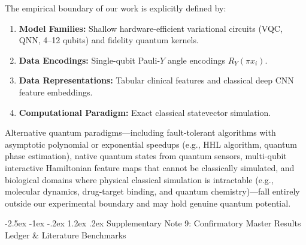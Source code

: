 \documentclass[10pt,a4paper]{article}
\makeatletter
\renewcommand{\section}{\@startsection{section}{1}{\z@}%
  {-2.5ex \@plus -1ex \@minus -.2ex}%
  {1.2ex \@plus.2ex}%
  {\normalfont\Large\sffamily\bfseries\color{naturedark}}}
\makeatother
\begin{document}
The empirical boundary of our work is explicitly defined by:
\begin{enumerate}
  \item \textbf{Model Families:} Shallow hardware-efficient variational circuits (VQC, QNN, 4--12 qubits) and fidelity quantum kernels.
  \item \textbf{Data Encodings:} Single-qubit Pauli-$Y$ angle encodings $R_Y(\pi x_i)$.
  \item \textbf{Data Representations:} Tabular clinical features and classical deep CNN feature embeddings.
  \item \textbf{Computational Paradigm:} Exact classical statevector simulation.
\end{enumerate}
Alternative quantum paradigms---including fault-tolerant algorithms with asymptotic polynomial or exponential speedups (e.g., HHL algorithm, quantum phase estimation), native quantum states from quantum sensors, multi-qubit interactive Hamiltonian feature maps that cannot be classically simulated, and biological domains where physical classical simulation is intractable (e.g., molecular dynamics, drug-target binding, and quantum chemistry)---fall entirely outside our experimental boundary and may hold genuine quantum potential.

\newpage

\section{Supplementary Note 9: Confirmatory Master Results Ledger \& Literature Benchmarks}
\end{document}

